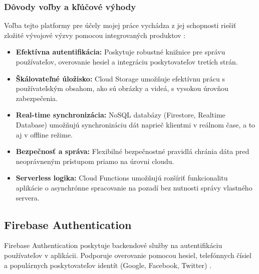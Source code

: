 \subsubsection{Dôvody voľby a kľúčové výhody}
Voľba tejto platformy pre účely mojej práce vychádza z jej schopnosti riešiť zložité vývojové výzvy pomocou integrovaných produktov  \cite{gfg_firebase}:
\begin{itemize}
    \item \textbf{Efektívna autentifikácia:} Poskytuje robustné knižnice pre správu používateľov, overovanie hesiel a integráciu poskytovateľov tretích strán.
    \item \textbf{Škálovateľné úložisko:} Cloud Storage umožňuje efektívnu prácu s používateľským obsahom, ako sú obrázky a videá, s vysokou úrovňou zabezpečenia.
    \item \textbf{Real-time synchronizácia:} NoSQL databázy (Firestore, Realtime Database) umožňujú synchronizáciu dát naprieč klientmi v reálnom čase, a to aj v offline režime.
    \item \textbf{Bezpečnosť a správa:} Flexibilné bezpečnostné pravidlá chránia dáta pred neoprávneným prístupom priamo na úrovni cloudu.
    \item \textbf{Serverless logika:} Cloud Functions umožňujú rozšíriť funkcionalitu aplikácie o asynchrónne spracovanie na pozadí bez nutnosti správy vlastného servera.
\end{itemize}

\subsection{Firebase Authentication}
Firebase Authentication poskytuje backendové služby na autentifikáciu používateľov v aplikácii. 
Podporuje overovanie pomocou hesiel, telefónnych čísiel a populárnych poskytovateľov identít (Google, Facebook, Twitter) \cite{firebase_auth_docs}. 

